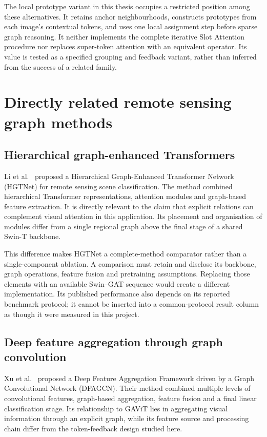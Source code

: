 The local prototype variant in this thesis occupies a restricted position
among these alternatives. It retains anchor neighbourhoods, constructs
prototypes from each image's contextual tokens, and uses one local assignment
step before sparse graph reasoning. It neither implements the complete
iterative Slot Attention procedure nor replaces super-token attention with
an equivalent operator. Its value is tested as a specified grouping and
feedback variant, rather than inferred from the success of a related family.

\section{Directly related remote sensing graph methods}

\subsection{Hierarchical graph-enhanced Transformers}

Li et al.~\cite{li2024hgtnet} proposed a Hierarchical Graph-Enhanced
Transformer Network (HGTNet) for remote sensing scene classification. The
method combined hierarchical Transformer representations, attention modules
and graph-based feature extraction. It is directly relevant to the claim
that explicit relations can complement visual attention in this application.
Its placement and organisation of modules differ from a single regional
graph above the final stage of a shared Swin-T backbone.

This difference makes HGTNet a complete-method comparator rather than a
single-component ablation. A comparison must retain and disclose its
backbone, graph operations, feature fusion and pretraining assumptions.
Replacing those elements with an available Swin--GAT sequence would create
a different implementation. Its published performance also depends on its
reported benchmark protocol; it cannot be inserted into a common-protocol
result column as though it were measured in this project.

\subsection{Deep feature aggregation through graph convolution}

Xu et al.~\cite{xu2022dfagcn} proposed a Deep Feature Aggregation Framework
driven by a Graph Convolutional Network (DFAGCN). Their method combined
multiple levels of convolutional features, graph-based aggregation, feature
fusion and a final linear classification stage. Its relationship to GAViT
lies in aggregating visual information through an explicit graph, while
its feature source and processing chain differ from the token-feedback
design studied here.

